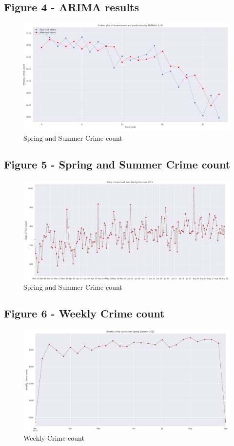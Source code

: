 \documentclass[a4paper, twocolumn]{article}
\begin{document}
\subsection{Figure 4 - ARIMA results}\label{appendix:fig5}
\begin{figure}[h]
\includegraphics[width=\textwidth]{fig6.png}
\caption{Spring and Summer Crime count}
\end{figure}
\newpage

\subsection{Figure 5 - Spring and Summer Crime count}\label{appendix:fig3}
\begin{figure}[h]
\includegraphics[width=\textwidth]{fig3.png}
\caption{Spring and Summer Crime count}
\end{figure}
\newpage

\subsection{Figure 6 - Weekly Crime count}\label{appendix:fig4}
\begin{figure}[h]
\includegraphics[width=\textwidth]{fig4.png}
\caption{Weekly Crime count}
\end{figure}
\end{document}
